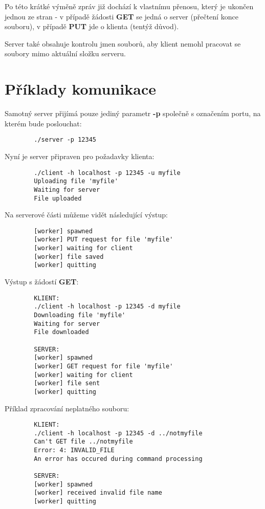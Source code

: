 \documentclass[10pt,a4paper]{article}
\begin{document}
	Po této krátké výměně zpráv již dochází k vlastnímu přenosu, který je ukončen jednou ze stran - v případě žádosti \textbf{GET} se jedná o server (přečtení konce souboru), v případě \textbf{PUT} jde o klienta (tentýž důvod).\newline
	
	Server také obsahuje kontrolu jmen souborů, aby klient nemohl pracovat se soubory mimo aktuální složku serveru.
	
	\section{Příklady komunikace}
	Samotný server přijímá pouze jediný parametr \textbf{-p} společně s označením portu, na kterém bude poslouchat:
	\begin{verbatim}
		./server -p 12345
	\end{verbatim}
	
	Nyní je server připraven pro požadavky klienta:
	\begin{verbatim}
		./client -h localhost -p 12345 -u myfile
		Uploading file 'myfile'
		Waiting for server
		File uploaded
	\end{verbatim}
	
	Na serverové části můžeme vidět následující výstup:
	\begin{verbatim}
		[worker] spawned
		[worker] PUT request for file 'myfile'
		[worker] waiting for client
		[worker] file saved
		[worker] quitting
	\end{verbatim}
	
	Výstup s žádostí \textbf{GET}:
	\begin{verbatim}
		KLIENT:
		./client -h localhost -p 12345 -d myfile
		Downloading file 'myfile'
		Waiting for server
		File downloaded
		
		SERVER:
		[worker] spawned
		[worker] GET request for file 'myfile'
		[worker] waiting for client
		[worker] file sent
		[worker] quitting
	\end{verbatim}
	
	Příklad zpracování neplatného souboru:
	\begin{verbatim}
		KLIENT:
		./client -h localhost -p 12345 -d ../notmyfile
		Can't GET file ../notmyfile
		Error: 4: INVALID_FILE
		An error has occured during command processing
		
		SERVER:
		[worker] spawned
		[worker] received invalid file name
		[worker] quitting
	\end{verbatim}
\end{document}
